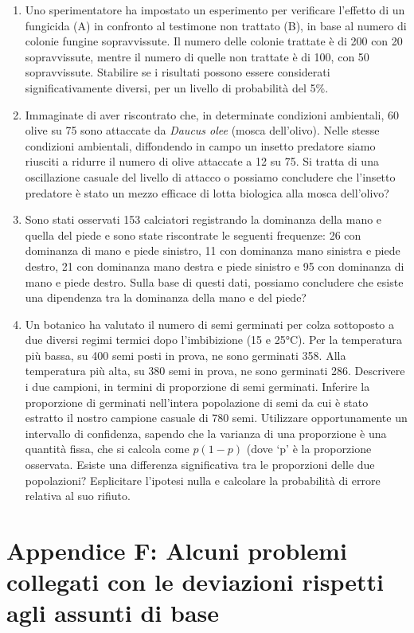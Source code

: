 \documentclass[
  12pt,
]{book}
\providecommand{\tightlist}{%
  \setlength{\itemsep}{0pt}\setlength{\parskip}{0pt}}
\begin{document}
\begin{enumerate}
\def\labelenumi{\arabic{enumi}.}
\tightlist
\item
  Uno sperimentatore ha impostato un esperimento per verificare l'effetto di un fungicida (A) in confronto al testimone non trattato (B), in base al numero di colonie fungine sopravvissute. Il numero delle colonie trattate è di 200 con 20 sopravvissute, mentre il numero di quelle non trattate è di 100, con 50 sopravvissute. Stabilire se i risultati possono essere considerati significativamente diversi, per un livello di probabilità del 5\%.
\item
  Immaginate di aver riscontrato che, in determinate condizioni ambientali, 60 olive su 75 sono attaccate da \emph{Daucus olee} (mosca dell'olivo). Nelle stesse condizioni ambientali, diffondendo in campo un insetto predatore siamo riusciti a ridurre il numero di olive attaccate a 12 su 75. Si tratta di una oscillazione casuale del livello di attacco o possiamo concludere che l'insetto predatore è stato un mezzo efficace di lotta biologica alla mosca dell'olivo?
\item
  Sono stati osservati 153 calciatori registrando la dominanza della mano e quella del piede e sono state riscontrate le seguenti frequenze: 26 con dominanza di mano e piede sinistro, 11 con dominanza mano sinistra e piede destro, 21 con dominanza mano destra e piede sinistro e 95 con dominanza di mano e piede destro. Sulla base di questi dati, possiamo concludere che esiste una dipendenza tra la dominanza della mano e del piede?
\item
  Un botanico ha valutato il numero di semi germinati per colza sottoposto a due diversi regimi termici dopo l'imbibizione (15 e 25°C). Per la temperatura più bassa, su 400 semi posti in prova, ne sono germinati 358. Alla temperatura più alta, su 380 semi in prova, ne sono germinati 286. Descrivere i due campioni, in termini di proporzione di semi germinati. Inferire la proporzione di germinati nell'intera popolazione di semi da cui è stato estratto il nostro campione casuale di 780 semi. Utilizzare opportunamente un intervallo di confidenza, sapendo che la varianza di una proporzione è una quantità fissa, che si calcola come \(p ( 1- p)\) (dove `p' è la proporzione osservata. Esiste una differenza significativa tra le proporzioni delle due popolazioni? Esplicitare l'ipotesi nulla e calcolare la probabilità di errore relativa al suo rifiuto.
\end{enumerate}

\hypertarget{appendice-f-alcuni-problemi-collegati-con-le-deviazioni-rispetti-agli-assunti-di-base}{%
\chapter{Appendice F: Alcuni problemi collegati con le deviazioni rispetti agli assunti di base}\label{appendice-f-alcuni-problemi-collegati-con-le-deviazioni-rispetti-agli-assunti-di-base}}
\end{document}
